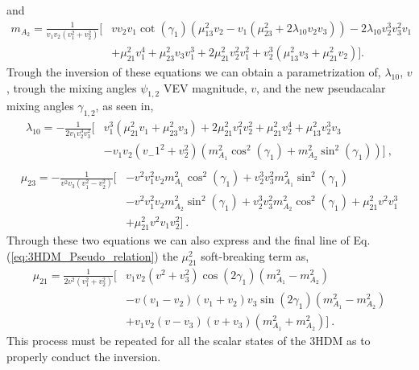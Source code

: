 %
and 
%
\begin{equation}
\begin{split}
m_{A_2} = \frac{1}{v_1 v_2 \left(v_1^2+v_2^2\right)} \Bigg[ & v v_2 v_1 \cot \left(\gamma _1\right) \left(\mu _{13}^2 v_2-v_1 \left(\mu _{23}^2+2 \lambda _{10} v_2 v_3\right)\right)-2 \lambda_{10} v_2^3 v_3^2 v_1 \\ & +\mu _{21}^2 v_1^4+\mu _{23}^2 v_3 v_1^3+2 \mu_{21}^2 v_2^2 v_1^2+v_2^3 \left(\mu _{13}^2 v_3+\mu _{21}^2 v_2\right) \Bigg].
\end{split} 
\end{equation} 
%
Trough the inversion of these equations we can obtain a parametrization of, $\lambda_{10}$, $v$, trough the mixing angles $\psi_{1,2}$ VEV magnitude, $v$, and the new pseudacalar mixing angles $\gamma_{1,2}$, as seen in,
%
\begin{equation}
\begin{split}
\lambda_{10} = - \frac{1}{2 v_1 v_2^3 v_3^2}  \Bigg[ & v_1^3 \left(\mu_{21}^2 v_1+\mu_{23}^2 v_3 \right) +2 \mu_{21}^2 v_1^2 v_2^2 + \mu_{21}^2 v_2^4 +\mu_{13}^2 v_2^3 v_3 \\ & - v_1 v_2 \left( v_-1^2 + v_2^2 \right) \left(m_{A_1}^2 \cos^2\left(\gamma _1\right)+m_{A_2}^2 \sin ^2\left(\gamma _1\right)\right) \Bigg] \ , \\
\end{split}
\end{equation}
%
\begin{equation}
\begin{split}
\mu_{23} = -\frac{1}{v^2 v_3 \left(v_1^2-v_2^2\right)} \Bigg[  & -v^2 v_1^2 v_2 m_{A_1}^2 \cos ^2\left(\gamma _1\right)+v_2^3 v_3^2 m_{A_1}^2 \sin ^2\left(\gamma _1\right) \\ & - v^2 v_1^2 v_2 m_{A_2}^2 \sin^2\left(\gamma _1\right)  +v_2^3 v_3^2 m_{A_2}^2\cos^2\left(\gamma _1\right)+\mu_{21}^2 v^2 v_1^3 \\ & + \mu_{21}^2 v^2 v_1 v_2^2 \Bigg] \  . 
\end{split}
\end{equation}
Through these two equations we can also express and the final line of Eq.\,(\ref{eq:3HDM_Pseudo_relation}) the $\mu_{21}^2$ soft-breaking term as, 
\begin{equation}
\begin{split} 
\mu_{21}  = \frac{1}{2 v^2 \left(v_1^2+v_2^2\right)} \Bigg[& v_1 v_2 \left(v^2+v_3^2\right) \cos \left(2 \gamma _1\right) \left(m_{A_1}^2-m_{A_2}^2\right) \\ & - v \left(v_1-v_2\right) \left(v_1+v_2\right) v_3 \sin \left(2 \gamma _1\right) 
   \left(m_{A_1}^2-m_{A_2}^2\right) \\ & +v_1 v_2 \left(v-v_3\right) \left(v+v_3\right) \left(m_{A_1}^2+m_{A_2}^2\right) \Bigg] \ .  
\end{split}
\end{equation}
%
This process must be repeated for all the scalar states of the 3HDM as to properly conduct the inversion. 
%

